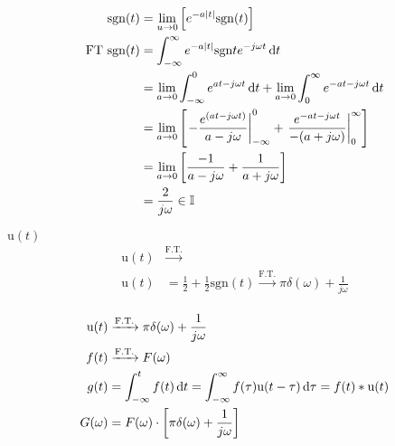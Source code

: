 \begin{enumgreekpar}
     \begin{align*}
     \mathrm{sgn}(t)&=\lim_{u\to0}\left[
     e^{-a|t|}\mathrm{sgn}(t)
     \right] \\
     \mathrm{ FT }\ \mathrm{sgn}(t) &=
     \int_{-\infty}^{\infty} e^{-a|t|}\mathrm{sgn}te^{-j\omega t}\mathop{}\!\mathrm{d} t
     \\ &= \lim_{a\to0}\int_{-\infty}^{0} e^{at-j\omega t}\mathop{}\!\mathrm{d} t
     + \lim_{a\to 0} \int_0^\infty e^{-at-j\omega t}\mathop{}\!\mathrm{d} t
     \\ &=
     \lim_{a\to0}\left[ \left.-\frac{e^{(at-j\omega t)}}{a-j\omega }
     \right|_{-\infty}^0 + \left. \frac{e^{-at-j\omega t}}{-(a+j\omega )}
     \right|_0^\infty
      \right]
     \\ &= \lim_{a\to 0} \left[ \frac{-1}{a-j\omega }+\frac{1}{a+j\omega} \right]
     \\ &= \frac{2}{j\omega }\in\mathbb I
     \end{align*}

     \item \( \displaystyle \mathrm u(t) \)
     \begin{align*}
     \mathrm u(t) &\xrightarrow{\text{F.T.}} \\
     \mathrm u(t) &= \frac{1}{2}+\frac{1}{2}\mathrm{sgn}(t)
     \xrightarrow{\text{F.T.}} \pi\delta(\omega ) +\frac{1}{j\omega }
     \end{align*}


     \paragraph{}
     \begin{align*}
     \mathrm u(t) &\xrightarrow{\text{F.T.}} \pi\delta(\omega )+\frac{1}{j\omega }\\
     f(t) &\xrightarrow{\text{F.T.}} F(\omega ) \\
     g(t) &= \int_{-\infty}^{t}f(t)\mathop{}\!\mathrm{d} t = \int_{-\infty}^{\infty} f(\tau)
     \mathrm u(t-\tau)\mathop{}\!\mathrm{d}\tau = f(t)*\mathrm u(t) \\
     G(\omega ) &= F(\omega )\cdot\left[ \pi\delta(\omega )+\frac{1}{j\omega } \right]
     \end{align*}


\end{enumgreekpar}
